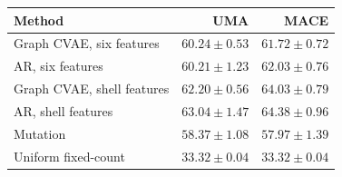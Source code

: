 \begin{tabular}{@{}lrr@{}}
\toprule Method & UMA & MACE\\
\midrule
Graph CVAE, six features & $60.24\pm0.53$ & $61.72\pm0.72$\\
AR, six features & $60.21\pm1.23$ & $62.03\pm0.76$\\
Graph CVAE, shell features & $62.20\pm0.56$ & $64.03\pm0.79$\\
AR, shell features & $63.04\pm1.47$ & $64.38\pm0.96$\\
Mutation & $58.37\pm1.08$ & $57.97\pm1.39$\\
Uniform fixed-count & $33.32\pm0.04$ & $33.32\pm0.04$\\
\bottomrule
\end{tabular}
